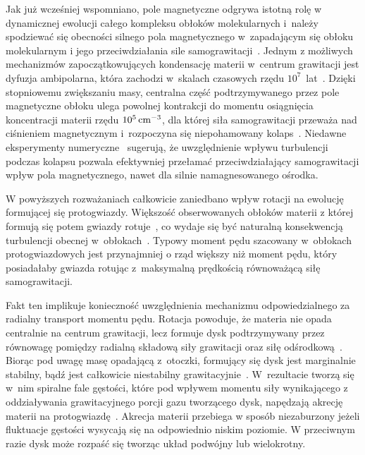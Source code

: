 \par Jak już wcześniej wspomniano, pole magnetyczne odgrywa istotną rolę w
dynamicznej ewolucji całego kompleksu obłoków molekularnych i~należy spodziewać
się obecności silnego pola magnetycznego w~zapadającym się obłoku molekularnym i
jego przeciwdziałania sile samograwitacji~\cite{MC99}. Jednym z możliwych
mechanizmów zapoczątkowujących kondensację materii w~centrum grawitacji jest
dyfuzja ambipolarna, która zachodzi w~skalach czasowych rzędu
$10^7$~lat~\cite{MZGH93}.  Dzięki stopniowemu zwiększaniu masy, centralna część
podtrzymywanego przez pole magnetyczne obłoku ulega powolnej kontrakcji do
momentu osiągnięcia koncentracji materii rzędu $10^{5}\hbox{$\thinspace\textrm{cm}$}^{-3}$, dla której
siła samograwitacji przeważa nad ciśnieniem magnetycznym i~rozpoczyna się
niepohamowany kolaps~\cite{BM94, CB00}. Niedawne eksperymenty
numeryczne~\cite{JHCF13} sugerują, że uwzględnienie wpływu turbulencji podczas
kolapsu pozwala efektywniej przełamać przeciwdziałający samograwitacji wpływ
pola magnetycznego, nawet dla silnie namagnesowanego ośrodka.

\par W powyższych rozważaniach całkowicie zaniedbano wpływ rotacji na ewolucję
formującej się protogwiazdy. Większość obserwowanych obłoków materii z której
formują się potem gwiazdy rotuje~\cite{GBFM93}, co wydaje się być naturalną
konsekwencją turbulencji obecnej w~obłokach~\cite{BB00}. Typowy moment pędu
szacowany w~obłokach protogwiazdowych jest przynajmniej o rząd większy niż
moment pędu, który posiadałaby gwiazda rotując z~maksymalną prędkością
równoważącą siłę samograwitacji. 

Fakt ten implikuje konieczność uwzględnienia mechanizmu odpowiedzialnego za
radialny transport momentu pędu. Rotacja powoduje, że materia nie opada
centralnie na centrum grawitacji, lecz formuje dysk podtrzymywany przez
równowagę pomiędzy radialną składową siły grawitacji oraz siłę
odśrodkową~\cite{TSC84}. Biorąc pod uwagę masę opadającą z~otoczki, formujący
się dysk jest marginalnie stabilny, bądź jest całkowicie niestabilny
grawitacyjnie~\cite{SKBT94}. W~rezultacie tworzą się w~nim spiralne fale
gęstości, które pod wpływem momentu siły wynikającego z oddziaływania
grawitacyjnego porcji gazu tworzącego dysk, napędzają akrecję materii na
protogwiazdę~\cite{St00}.
Akrecja materii przebiega w sposób niezaburzony jeżeli fluktuacje gęstości
wysycają się na odpowiednio niskim poziomie. W przeciwnym razie dysk może
rozpaść się tworząc układ podwójny lub wielokrotny.


